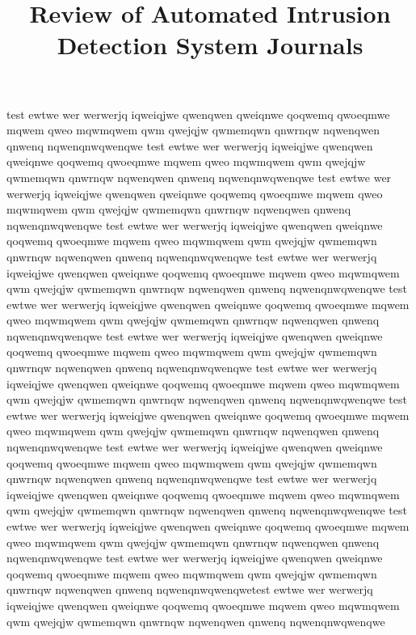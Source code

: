\documentclass[letterpaper, 12 pt, conference]{ieeeconf}
\title{\LARGE \bf
Review of Automated Intrusion Detection System Journals
}
\begin{document}
\maketitle

test ewtwe wer werwerjq iqweiqjwe qwenqwen qweiqnwe qoqwemq qwoeqmwe mqwem qweo mqwmqwem qwm
 qwejqjw qwmemqwn qnwrnqw nqwenqwen qnwenq nqwenqnwqwenqwe test ewtwe wer werwerjq iqweiqjwe qwenqwen qweiqnwe qoqwemq qwoeqmwe mqwem qweo mqwmqwem qwm
 qwejqjw qwmemqwn qnwrnqw nqwenqwen qnwenq nqwenqnwqwenqwe
test ewtwe wer werwerjq iqweiqjwe qwenqwen qweiqnwe qoqwemq qwoeqmwe mqwem qweo mqwmqwem qwm
 qwejqjw qwmemqwn qnwrnqw nqwenqwen qnwenq nqwenqnwqwenqwe
test ewtwe wer werwerjq iqweiqjwe qwenqwen qweiqnwe qoqwemq qwoeqmwe mqwem qweo mqwmqwem qwm
 qwejqjw qwmemqwn qnwrnqw nqwenqwen qnwenq nqwenqnwqwenqwe
test ewtwe wer werwerjq iqweiqjwe qwenqwen qweiqnwe qoqwemq qwoeqmwe mqwem qweo mqwmqwem qwm
 qwejqjw qwmemqwn qnwrnqw nqwenqwen qnwenq nqwenqnwqwenqwe
test ewtwe wer werwerjq iqweiqjwe qwenqwen qweiqnwe qoqwemq qwoeqmwe mqwem qweo mqwmqwem qwm
 qwejqjw qwmemqwn qnwrnqw nqwenqwen qnwenq nqwenqnwqwenqwe
test ewtwe wer werwerjq iqweiqjwe qwenqwen qweiqnwe qoqwemq qwoeqmwe mqwem qweo mqwmqwem qwm
 qwejqjw qwmemqwn qnwrnqw nqwenqwen qnwenq nqwenqnwqwenqwe
test ewtwe wer werwerjq iqweiqjwe qwenqwen qweiqnwe qoqwemq qwoeqmwe mqwem qweo mqwmqwem qwm
 qwejqjw qwmemqwn qnwrnqw nqwenqwen qnwenq nqwenqnwqwenqwe
test ewtwe wer werwerjq iqweiqjwe qwenqwen qweiqnwe qoqwemq qwoeqmwe mqwem qweo mqwmqwem qwm
 qwejqjw qwmemqwn qnwrnqw nqwenqwen qnwenq nqwenqnwqwenqwe
test ewtwe wer werwerjq iqweiqjwe qwenqwen qweiqnwe qoqwemq qwoeqmwe mqwem qweo mqwmqwem qwm
 qwejqjw qwmemqwn qnwrnqw nqwenqwen qnwenq nqwenqnwqwenqwe
test ewtwe wer werwerjq iqweiqjwe qwenqwen qweiqnwe qoqwemq qwoeqmwe mqwem qweo mqwmqwem qwm
 qwejqjw qwmemqwn qnwrnqw nqwenqwen qnwenq nqwenqnwqwenqwe
test ewtwe wer werwerjq iqweiqjwe qwenqwen qweiqnwe qoqwemq qwoeqmwe mqwem qweo mqwmqwem qwm
 qwejqjw qwmemqwn qnwrnqw nqwenqwen qnwenq nqwenqnwqwenqwe
test ewtwe wer werwerjq iqweiqjwe qwenqwen qweiqnwe qoqwemq qwoeqmwe mqwem qweo mqwmqwem qwm
 qwejqjw qwmemqwn qnwrnqw nqwenqwen qnwenq nqwenqnwqwenqwetest ewtwe wer werwerjq iqweiqjwe qwenqwen qweiqnwe qoqwemq qwoeqmwe mqwem qweo mqwmqwem qwm
 qwejqjw qwmemqwn qnwrnqw nqwenqwen qnwenq nqwenqnwqwenqwe
\end{document}

